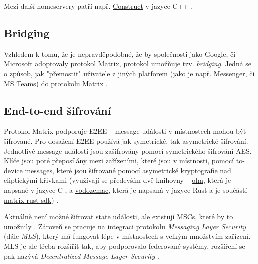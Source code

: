 Mezi další homeservery patří např.
\href{https://github.com/matrix-construct/construct}{Construct} v jazyce C++
\cite{GitHub-Construct}.

\subsection{Bridging}

Vzhledem k tomu, že je nepravděpodobné, že by společnosti jako Google, či
Microsoft adoptovaly protokol Matrix, protokol umožňuje tzv. \textit{bridging}.
Jedná se o způsob, jak "přemostit" uživatele z jiných platforem (jako je např.
Messenger, či MS Teams) do protokolu Matrix \cite{MatrixORG-Bridges}.

\subsection{End-to-end šifrování}\label{matrix-encryption}

Protokol Matrix podporuje E2EE -- message události v místnostech mohou být
šifrované. Pro dosažení E2EE používá jak symetrické, tak asymetrické šifrování.
Jednotlivé message události jsou zašifrovány pomocí symetrického šifrování AES.
Klíče jsou poté přeposílány mezi zařízeními, které jsou v místnosti, pomocí
to-device messages, které jsou šifrované pomocí asymetrické kryptografie nad
eliptickými křivkami (využívají se především dvě knihovny --
\href{https://gitlab.matrix.org/matrix-org/olm}{olm}, která je napsané v jazyce
C \cite{GitLab-Olm} , a
\href{https://github.com/matrix-org/vodozemac}{vodozemac}, která je napsaná v
jazyce Rust a je součástí
\href{https://github.com/matrix-org/matrix-rust-sdk}{matrix-rust-sdk})
\cite{GitHub-MatrixRustSDK}.

Aktuálně není možné šifrovat state události, ale existují MSCs, které by to
umožnily \cite{GitHub-MSC3414}. Zároveň se pracuje na integraci protokolu
\textit{Messaging Layer Security} (dále \textit{MLS}), který má fungovat lépe v
místnostech s velkým množstvím zařízení. MLS je ale třeba rozšířit tak, aby
podporovalo federované systémy, rozšíření se pak nazývá \textit{Decentralized
	Message Layer Security} \cite{AreWeMLSYet}.

